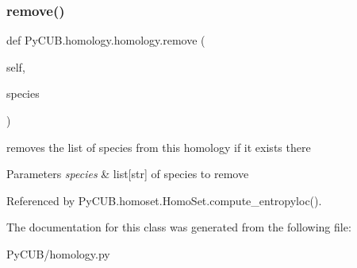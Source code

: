\subsubsection{\texorpdfstring{remove()}{remove()}}
{\footnotesize\ttfamily def Py\+C\+U\+B.\+homology.\+homology.\+remove (\begin{DoxyParamCaption}\item[{}]{self,  }\item[{}]{species }\end{DoxyParamCaption})}



removes the list of species from this homology if it exists there 


\begin{DoxyParams}{Parameters}
{\em species} & list\mbox{[}str\mbox{]} of species to remove \\
\hline
\end{DoxyParams}


Referenced by Py\+C\+U\+B.\+homoset.\+Homo\+Set.\+compute\+\_\+entropyloc().



The documentation for this class was generated from the following file\+:\begin{DoxyCompactItemize}
\item 
Py\+C\+U\+B/homology.\+py\end{DoxyCompactItemize}
